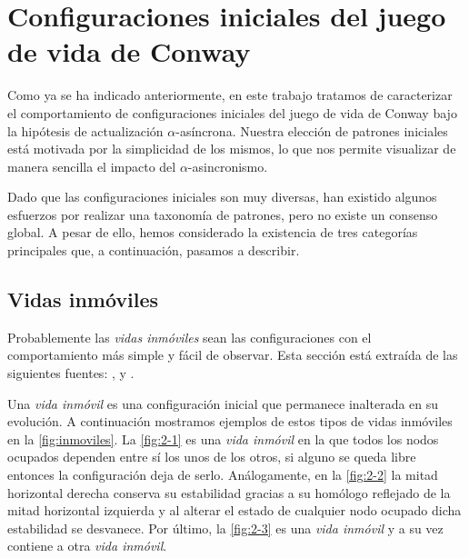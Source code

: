 \documentclass[../proyecto.tex]{memoir}
\begin{document}
\section{Configuraciones iniciales del juego de vida de Conway} \label{zoo}

Como ya se ha indicado anteriormente, en este trabajo tratamos de caracterizar el comportamiento de configuraciones iniciales del juego de vida de Conway bajo la hipótesis de actualización $\alpha$-asíncrona. Nuestra elección de patrones iniciales está motivada por la simplicidad de los mismos, lo que nos permite visualizar de manera sencilla el impacto del $\alpha$-asincronismo.

Dado que las configuraciones iniciales son muy diversas, han existido algunos esfuerzos por realizar una taxonomía de patrones, pero no existe un consenso global. A pesar de ello, hemos considerado la existencia de tres categorías principales que, a continuación, pasamos a describir.

\subsection{Vidas inmóviles}
Probablemente las \textit{vidas inmóviles} sean las configuraciones con el comportamiento más simple y fácil de observar. Esta sección está extraída de las siguientes fuentes: \cite{stillLifeProblem},\cite{stillLifeTheory} y \cite{LikeWikiStill}.

Una \textit{vida inmóvil} es una configuración inicial que permanece inalterada en su evolución. A continuación mostramos ejemplos de estos tipos de vidas inmóviles en la \autoref{fig:inmoviles}. La \autoref{fig:2-1} es una \textit{vida inmóvil} en la que todos los nodos ocupados dependen entre sí los unos de los otros, si alguno se queda libre entonces la configuración deja de serlo. Análogamente, en la \autoref{fig:2-2} la mitad horizontal derecha conserva su estabilidad gracias a su homólogo reflejado de la mitad horizontal izquierda y al alterar el estado de cualquier nodo ocupado dicha estabilidad se desvanece. Por último, la \autoref{fig:2-3} es una \textit{vida inmóvil} y a su vez contiene a otra \textit{vida inmóvil}.
\end{document}
